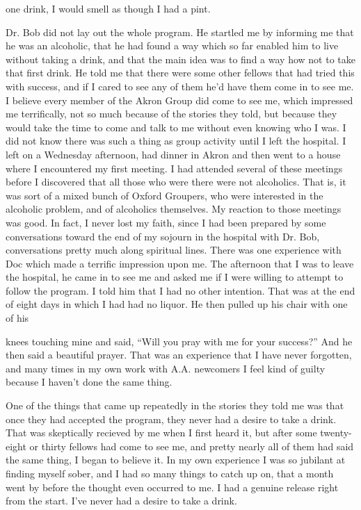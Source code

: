 \begin{biblechapter}
one drink, I would smell as though I had a pint.

Dr. Bob did not lay out the whole program. He startled me by informing me that he was an alcoholic, that he had found a way which so far enabled him to live without taking a drink, and that the main idea was to find a way how not to take that first drink. He told me that there were some other fellows that had tried this with success, and if I cared to see any of them he’d have them come in to see me. I believe every member of the Akron Group did come to see me, which impressed me terrifically, not so much because of the stories they told, but because they would take the time to come and talk to me without even knowing who I was. I did not know there was such a thing as group activity until I left the hospital. I left on a Wednesday afternoon, had dinner in Akron and then went to a house where I encountered my first meeting. I had attended several of these meetings before I discovered that all those who were there were not alcoholics. That is, it was sort of a mixed bunch of Oxford Groupers, who were interested in the alcoholic problem, and of alcoholics themselves. My reaction to those meetings was good. In fact, I never lost my faith, since I had been prepared by some conversations toward the end of my sojourn in the hospital with Dr. Bob, conversations pretty much along spiritual lines. There was one experience with Doc which made a terrific impression upon me. The afternoon that I was to leave the hospital, he came in to see me and asked me if I were willing to attempt to follow the program. I told him that I had no other intention. That was at the end of eight days in which I had had no liquor. He then pulled up his chair with one of his

knees touching mine and said, “Will you pray with me for your success?” And he then said a beautiful prayer. That was an experience that I have never forgotten, and many times in my own work with A.A. newcomers I feel kind of guilty because I haven’t done the same thing.

One of the things that came up repeatedly in the stories they told me was that once they had accepted the program, they never had a desire to take a drink. That was skeptically recieved by me when I first heard it, but after some twenty-eight or thirty fellows had come to see me, and pretty nearly all of them had said the same thing, I began to believe it. In my own experience I was so jubilant at finding myself sober, and I had so many things to catch up on, that a month went by before the thought even occurred to me. I had a genuine release right from the start. I’ve never had a desire to take a drink.


\end{biblechapter}
